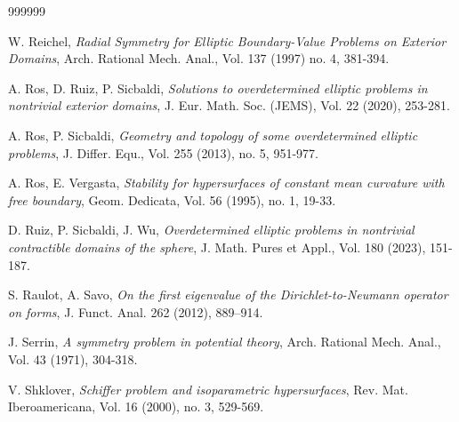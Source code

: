 \documentclass[11pt]{article}
\numberwithin{equation} {section}
\begin{document}
\begin{thebibliography}{999999}
	
	
	
	 W. Reichel, \emph{Radial Symmetry for Elliptic Boundary-Value Problems on Exterior Domains}, Arch. Rational Mech. Anal., Vol. 137 (1997) no. 4, 381-394.
	

	 A. Ros, D. Ruiz, P. Sicbaldi, \emph{Solutions to overdetermined elliptic problems in nontrivial exterior domains}, J. Eur. Math. Soc. (JEMS), Vol. 22 (2020), 253-281.
	
	 A. Ros, P. Sicbaldi, \emph{Geometry and topology of some overdetermined elliptic problems}, J. Differ. Equ., Vol. 255 (2013), no. 5, 951-977.
	
	 A. Ros, E. Vergasta, \emph{Stability for hypersurfaces of constant mean curvature with free boundary}, Geom. Dedicata, Vol. 56 (1995), no. 1, 19-33.
	
	 D. Ruiz, P. Sicbaldi, J. Wu, \emph{Overdetermined elliptic problems in nontrivial contractible domains of the sphere}, J. Math. Pures et Appl., Vol. 180 (2023), 151-187.
	
	 S. Raulot, A. Savo, \emph{On the first eigenvalue of the Dirichlet-to-Neumann operator on forms}, J. Funct. Anal. 262 (2012), 889–914.
	
	
	 J. Serrin, {\it A symmetry problem in potential theory}, Arch. Rational Mech. Anal., Vol. 43 (1971), 304-318.
	
	 V. Shklover, \emph{Schiffer problem and isoparametric hypersurfaces}, Rev. Mat. Iberoamericana, Vol. 16 (2000), no. 3, 529-569.
	

\end{thebibliography}
\end{document}
